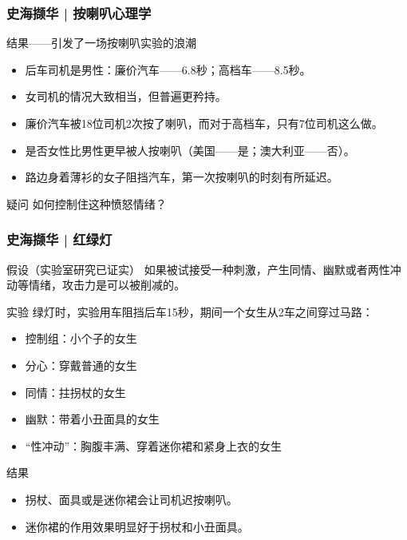 \begin{frame}
  \frametitle{史海撷华 | 按喇叭心理学}
  \begin{block}{结果——引发了一场按喇叭实验的浪潮}
    \begin{itemize}
      \item 后车司机是男性：廉价汽车——6.8秒；高档车——8.5秒。
      \item 女司机的情况大致相当，但普遍更矜持。
      \item 廉价汽车被18位司机2次按了喇叭，而对于高档车，只有7位司机这么做。
      \item 是否女性比男性更早被人按喇叭（美国——是；澳大利亚——否）。
      \item 路边身着薄衫的女子阻挡汽车，第一次按喇叭的时刻有所延迟。
    \end{itemize}
  \end{block}
  \pause
  \begin{block}{疑问}
    如何控制住这种愤怒情绪？
  \end{block}
\end{frame}

\begin{frame}
  \frametitle{史海撷华 | 红绿灯}
  \begin{block}{假设（实验室研究已证实）}
    如果被试接受一种刺激，产生同情、幽默或者两性冲动等情绪，攻击力是可以被削减的。
  \end{block}
  \vspace{-0.4em}
  \pause
  \begin{block}{实验}
    绿灯时，实验用车阻挡后车15秒，期间一个女生从2车之间穿过马路：
    \begin{itemize}
      \item 控制组：小个子的女生
      \item 分心：穿戴普通的女生
      \item 同情：拄拐杖的女生
      \item 幽默：带着小丑面具的女生
      \item “性冲动”：胸腹丰满、穿着迷你裙和紧身上衣的女生
    \end{itemize}
  \end{block}
  \vspace{-0.4em}
  \pause
  \begin{block}{结果}
    \begin{itemize}
      \item 拐杖、面具或是迷你裙会让司机迟按喇叭。
      \item 迷你裙的作用效果明显好于拐杖和小丑面具。
    \end{itemize}
  \end{block}
\end{frame}

